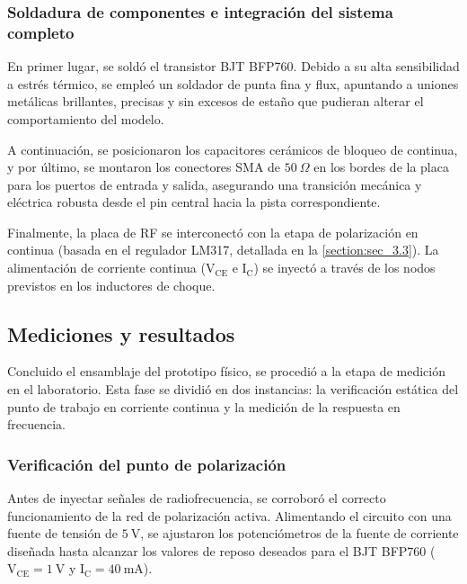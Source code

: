 \documentclass{article}
\begin{document}
\subsubsection{Soldadura de componentes e integración del sistema completo}
En primer lugar, se soldó el transistor BJT BFP760. Debido a su alta sensibilidad a estrés térmico, se empleó un soldador de punta fina y flux, apuntando a uniones metálicas brillantes, precisas y sin excesos de estaño que pudieran alterar el comportamiento del modelo.

A continuación, se posicionaron los capacitores cerámicos de bloqueo de continua, y por último, se montaron los conectores SMA de $50 \ \Omega$ en los bordes de la placa para los puertos de entrada y salida, asegurando una transición mecánica y eléctrica robusta desde el pin central hacia la pista correspondiente.

Finalmente, la placa de RF se interconectó con la etapa de polarización en continua (basada en el regulador LM317, detallada en la \autoref{section:sec_3.3}). La alimentación de corriente continua ($\mathrm{V_{CE}}$ e $\mathrm{I_C}$) se inyectó a través de los nodos previstos en los inductores de choque.
\\



\subsection{Mediciones y resultados} \label{section:sec_3.9}
Concluido el ensamblaje del prototipo físico, se procedió a la etapa de medición en el laboratorio. Esta fase se dividió en dos instancias: la verificación estática del punto de trabajo en corriente continua y la medición de la respuesta en frecuencia.
\\



\subsubsection{Verificación del punto de polarización}
Antes de inyectar señales de radiofrecuencia, se corroboró el correcto funcionamiento de la red de polarización activa. Alimentando el circuito con una fuente de tensión de $5\ \text{V}$, se ajustaron los potenciómetros de la fuente de corriente diseñada hasta alcanzar los valores de reposo deseados para el BJT BFP760 ($\mathrm{V_{CE}} = 1\ \text{V}$ y $\mathrm{I_C} = 40\ \text{mA}$).
\\
\end{document}
